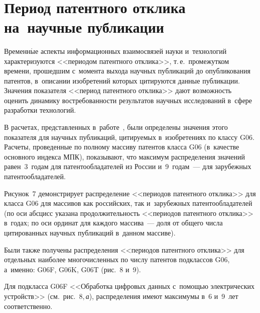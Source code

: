 \begin{multicols}{2}
    \begin{figure*} %
\vspace*{1pt}
 \begin{center}
 \mbox{%
 \epsfxsize=147.489mm
 }
 \end{center}
 \vspace*{-9pt}
     \end{figure*} 

\section{Период патентного отклика на~научные 
публикации}
     
     Временн$\acute{\mbox{ы}}$е аспекты информационных взаимосвязей 
науки и~технологий характеризуются <<периодом патентного отклика>>, т.\,е.\ 
промежутком времени, прошедшим с~момента выхода научных публи\-каций до 
опубликования патентов, в~описании изобретений которых цитируются данные 
пуб\-ли\-ка\-ции. Значения показателя <<период патентного отклика>> дают 
возможность оценить динамику востребованности результатов научных 
исследований в~сфере разработки технологий.
     
     В расчетах, представленных в~работе~\cite{19-min}, были определены 
значения этого показателя для научных публикаций, цитируемых в~изобретениях 
по классу G06. Расчеты, проведенные по полному массиву патентов класса G06 
(в~качестве основного индекса МПК), показывают, что максимум распределения 
значений равен~3~годам для патентообладателей из России и~9~годам~--- для 
зарубежных патентообладателей.
     
     Рисунок~7 демонстрирует распределение <<периодов патентного 
отклика>> для класса G06 для массивов как российских, так и~зарубежных 
патентообладателей (по оси абсцисс указана продолжительность <<периодов 
патентного отклика>> в~годах; по оси ординат для каждого массива~--- доля  
от общего числа цитированных научных публикаций в~данном массиве).


      
     
     Были также получены распределения <<периодов патентного отклика>> для 
отдельных наиболее многочисленных по числу патентов подклассов G06, 
а~именно: G06F, G06K, G06T (рис.~8 и~9).



     
     Для подкласса G06F <<Обработка цифровых данных с~помощью 
электрических устройств>> (см.\ рис.~8,\,\textit{а}), распределения имеют максимумы 
в~6 и~9~лет соответственно.



\end{multicols}
